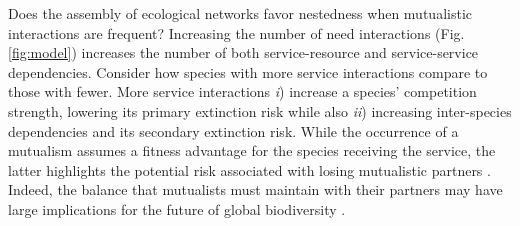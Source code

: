 \documentclass[twocolumn,preprintnumbers,amsmath,amssymb,superscriptaddress,linenumbers]{revtex4-1}
\begin{document}
Does the assembly of ecological networks favor nestedness when mutualistic interactions are frequent?
Increasing the number of need interactions (Fig. \ref{fig:model}) increases the number of both service-resource and service-service dependencies.
Consider how species with more service interactions compare to those with fewer.
More service interactions \emph{i}) increase a species' competition strength, lowering its primary extinction risk while also \emph{ii}) increasing inter-species dependencies and its secondary extinction risk.
While the occurrence of a mutualism assumes a fitness advantage for the species receiving the service, the latter highlights the potential risk associated with losing mutualistic partners \cite{Bond1994,Colwell2012}.
Indeed, the balance that mutualists must maintain with their partners may have large implications for the future of global biodiversity \cite{Dunn2009}.
\end{document}
